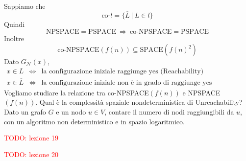 Sappiamo che 
$$
    \text{co-}l = \{ \overline{L} ~|~ L\in l \}
$$
Quindi 
$$
    \text{NPSPACE}=\text{PSPACE}
    ~\Rightarrow~
    \text{co-NPSPACE}= \text{PSPACE}
$$
Inoltre
$$
    \text{co-NPSPACE}(f(n)) \subseteq \text{SPACE}(f(n)^2)
$$
Dato $G_\mathcal{N}(x)$, 
\begin{eqnarray*}
    x\in L &\Leftrightarrow& \text{la configurazione iniziale raggiunge yes (Reachability)}\\
    x\in \overline{L} &\Leftrightarrow& \text{la configurazione iniziale non è in grado di raggiunge yes (Unreachability)}
\end{eqnarray*}
Vogliamo studiare la relazione tra co-NPSPACE$(f(n))$ e NPSPACE$(f(n))$. Qual è la complessità spa\-zia\-le nondeterministica di Unreachability? Dato un grafo $G$ e un nodo $u\in V$, contare il numero di nodi raggiungibili da $u$, con un algoritmo non deterministico e in spazio logaritmico.

\textcolor{Red}{TODO: lezione 19}

\textcolor{Red}{TODO: lezione 20}
